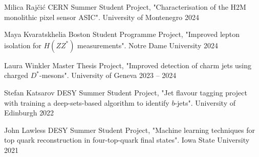 \begin{cvhonors}
  \cvhonor
    {Milica Rajčić} %
    {CERN Summer Student Project, "Characterisation of the H2M monolithic pixel sensor ASIC".} %
    {University of Montenegro} %
    {2024} %

  \cvhonor
    {Maya Kvaratskhelia} %
    {Boston Student Programme Project, "Improved lepton isolation for \(H(ZZ^{\ast})\) measurements".} %
    {Notre Dame University} %
    {2024} %

  \cvhonor
    {Laura Winkler} %
    {Master Thesis Project, "Improved detection of charm jets using charged \(D^{\ast}\)-mesons".} %
    {University of Geneva} %
    {2023 -- 2024} %

  \cvhonor
    {Stefan Katsarov} %
    {DESY Summer Student Project, "Jet flavour tagging project with training a deep-sets-based algorithm to identify \(b\)-jets".} %
    {University of Edinburgh} %
    {2022} %

  \cvhonor
    {John Lawless} %
    {DESY Summer Student Project, "Machine learning techniques for top quark reconstruction in four-top-quark final states".} %
    {Iowa State University} %
    {2021} %
\end{cvhonors}

